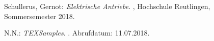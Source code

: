 \begin{thebibliography}{10}

{\sc Schullerus, Gernot}: {\em {Elektrische Antriebe}}.
, Hochschule Reutlingen, Sommersemester 2018.

{N.N.}: {\em {TEXSamples}}.
. Abrufdatum: 11.07.2018.

\end{thebibliography}

